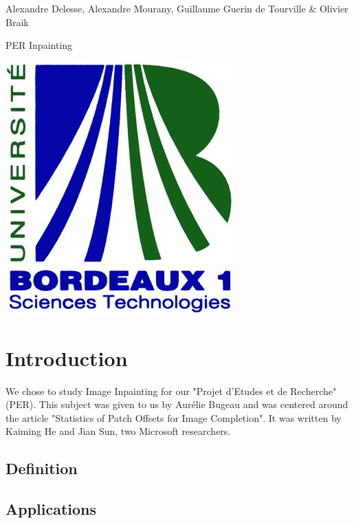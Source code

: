 \documentclass[12pt]{article}
\begin{document}
\maketitle
Alexandre Delesse, Alexandre Mourany, Guillaume Guerin de Tourville \& Olivier Braik
\bigskip
\newline
\begin{center}
{\Huge PER Inpainting}
\end{center}
\bigskip
\begin{center}
\includegraphics[scale=0.2]{img/LogoBx1nu.jpg}
\end{center}

\newpage

\tableofcontents
\newpage

\section{Introduction}

We chose to study Image Inpainting for our "Projet d'Etudes et de Recherche" (PER). This subject was given to us by Aurélie Bugeau and was centered around the article "Statistics of Patch Offsets for Image Completion". It was written by Kaiming He and Jian Sun, two Microsoft researchers. 

\subsection{Definition}
\subsection{Applications}
\end{document}
